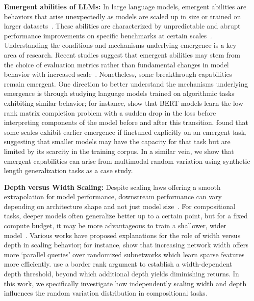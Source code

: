 \textbf{Emergent abilities of LLMs:} In large language models, emergent abilities are behaviors that arise unexpectedly as models are scaled up in size or trained on larger datasets~\citep{hestness2017deeplearningscalingpredictable,rosenfeld2019constructivepredictiongeneralizationerror,brown2020language,kaplan2020scaling}. These abilities are characterized by unpredictable and abrupt performance improvements on specific benchmarks at certain scales~\citep{wei2022emergent, ganguli2022predictability, srivastava2023beyond}. Understanding the conditions and mechanisms underlying emergence is a key area of research. Recent studies suggest that emergent abilities may stem from the choice of evaluation metrics rather than fundamental changes in model behavior with increased scale~\citep{schaeffer2024emergent}. Nonetheless, some breakthrough capabilities remain emergent. One direction to better understand the mechanisms underlying emergence is through studying language models trained on algorithmic tasks exhibiting similar behavior; for instance, \citet{gopalaniabrupt} show that BERT models learn the low-rank matrix completion problem with a sudden drop in the loss before interpreting components of the model before and after this transition.  \citet{snell2024predicting} found that some scales exhibit earlier emergence if finetuned explicitly on an emergent task, suggesting that smaller models may have the capacity for that task but are limited by its scarcity in the training corpus.  In a similar vein, we show that emergent capabilities can arise from multimodal random variation using synthetic length generalization tasks as a case study.

\textbf{Depth versus Width Scaling:} Despite scaling laws offering a smooth extrapolation for model performance, downstream performance can vary depending on architecture shape and not just model size~\citep{tayscale}. For compositional tasks, deeper models often generalize better up to a certain point, but for a fixed compute budget, it may be more advantageous to train a shallower, wider model~\citep{petty2024impact}. Various works have proposed explanations for the role of width versus depth in scaling behavior; for instance, \citet{edelman2024pareto} show that increasing network width offers more `parallel queries' over randomized subnetworks which learn sparse features more efficiently.  \citet{levine2020limits} use a border rank argument to establish a width-dependent depth threshold, beyond which additional depth yields diminishing returns. In this work, we specifically investigate how independently scaling width and depth influences the random variation distribution in compositional tasks.